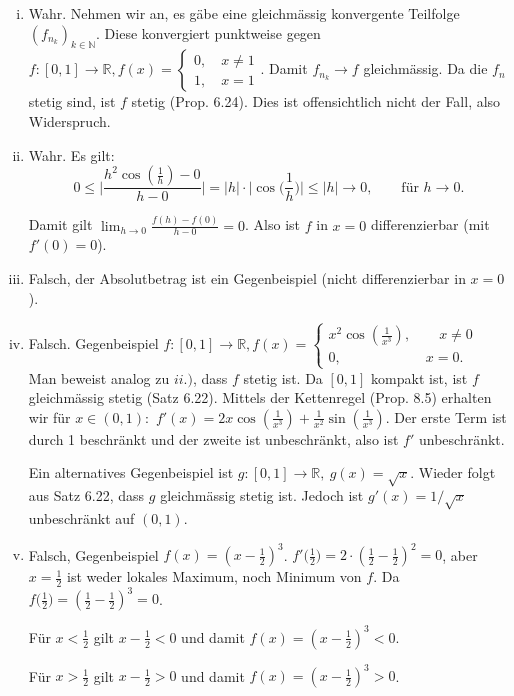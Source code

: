 \documentclass[a4paper, 20]{exam}
\newcommand\RR{\mathbb{R}}
\newcommand\NN{\mathbb{N}}
\begin{document}
\begin{solution}
\begin{enumerate}[i.)]
\item
Wahr. Nehmen wir an, es g\"abe eine gleichm\"assig konvergente Teilfolge $(f_{n_k})_{k\in \NN}$. Diese konvergiert punktweise gegen $f:[0,1]\longrightarrow \RR, f(x) = \begin{cases} 0, \quad x\neq 1 \\ 1, \quad x=1 \end{cases}$. Damit $f_{n_k} \longrightarrow f$ gleichm\"assig. Da die $f_n$ stetig sind, ist $f$ stetig (Prop. 6.24). Dies ist offensichtlich nicht der Fall, also Widerspruch.
\item
Wahr. Es gilt:
$$ 0\leq \bigg\vert \frac{h^2 \cos(\frac{1}{h}) - 0}{h-0} \bigg\vert = \vert h \vert \cdot \big\vert \cos\big(\frac{1}{h}\big) \big\vert \leq \vert h \vert \longrightarrow 0, \qquad \text{f\"ur } h\longrightarrow 0.$$

Damit gilt $\lim_{h\rightarrow 0} \frac{f(h)- f(0)}{h-0}=0$. Also ist $f$ in $x=0$ differenzierbar (mit $f'(0)=0$).
\item
Falsch, der Absolutbetrag ist ein Gegenbeispiel (nicht differenzierbar in $x=0$).
\item
Falsch. Gegenbeispiel $f:[0,1] \longrightarrow \RR, f(x) = \begin{cases} x^2 \cos(\frac{1}{x^3}), \qquad x\neq 0 \\ 0, \qquad \qquad \qquad x=0.\end{cases}$ Man beweist analog zu $ii.)$, dass $f$ stetig ist. Da $[0,1]$ kompakt ist, ist $f$ gleichm\"assig stetig (Satz 6.22). Mittels der Kettenregel (Prop. 8.5) erhalten wir f\"ur $x\in (0,1):$ $f'(x)= 2x \cos(\frac{1}{x^3})+ \frac{1}{x^2} \sin(\frac{1}{x^3})$. Der erste Term ist durch 1 beschr\"ankt und der zweite ist unbeschr\"ankt, also ist $f'$ unbeschr\"ankt.

Ein alternatives Gegenbeispiel ist $g:[0,1]\longrightarrow \RR, \ g(x)=\sqrt{x}$. Wieder folgt aus Satz 6.22, dass $g$ gleichm\"assig stetig ist. Jedoch ist $g'(x)= 1/\sqrt{x}$ unbeschr\"ankt auf $(0,1)$.
\item
Falsch, Gegenbeispiel $f(x)=(x-\frac{1}{2})^3$. $f'\big(\frac{1}{2}\big)= 2\cdot (\frac{1}{2} - \frac{1}{2})^2=0$, aber $x=\frac{1}{2}$ ist weder lokales Maximum, noch Minimum von $f$. Da $f\big(\frac{1}{2}\big)= (\frac{1}{2}-\frac{1}{2})^3=0$. 

F\"ur $x<\frac{1}{2}$ gilt $x-\frac{1}{2}<0$ und damit $f(x)=(x-\frac{1}{2})^3<0$.

F\"ur $x>\frac{1}{2}$ gilt $x-\frac{1}{2}>0$ und damit $f(x)=(x-\frac{1}{2})^3>0$.
\end{enumerate}
\end{solution}
\end{document}
